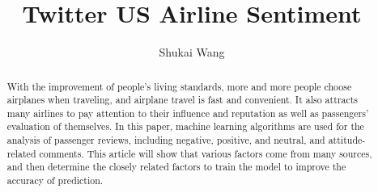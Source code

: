 \documentclass{amsart}
\begin{document}
%
%
\title[Twitter US Airline Sentiment]{Twitter US Airline Sentiment}%

\author{Shukai Wang}
\address[A.~1]{School of Computer Science,\\ 
Xi'an Shiyou University, Shaanxi 710065, China}%




%
%
\date{\gitAuthorDate}%

\begin{abstract}
  With the improvement of people's living standards, 
  more and more people choose airplanes when traveling, 
  and airplane travel is fast and convenient. It also attracts many airlines 
  to pay attention to their influence and reputation as well as passengers' 
  evaluation of themselves. In this paper, machine learning algorithms are used
   for the analysis of passenger reviews, including negative, positive, and neutral,
    and attitude-related comments. This article will show that various factors come 
    from many sources, and then determine the closely related factors to train the model 
    to improve the accuracy of prediction.
\end{abstract}

\maketitle
\tableofcontents

\newpage



\newpage



\end{document}

